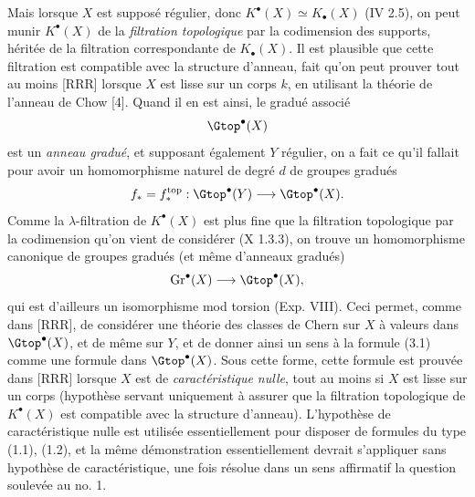 Mais lorsque $X$ est supposé régulier, donc $K^\bullet(X)\simeq K_\bullet(X)$ (IV 2.5), on peut munir $K^\bullet(X)$ de la \emph{filtration topologique} par la codimension des supports, héritée de la filtration correspondante de $K_\bullet(X)$. Il est plausible que cette filtration est compatible avec la structure d'anneau, fait qu'on peut prouver tout au moins [RRR] lorsque $X$ est lisse sur un corps $k$, en utilisant la théorie de l'anneau de Chow [4]. Quand il en est ainsi, le gradué associé
\[
 \Gtop^\bullet(X)
\]
est un \emph{anneau gradué}, et supposant également $Y$ régulier, on a fait ce qu'il fallait pour avoir un homomorphisme naturel de degré $d$ de groupes gradués
\[
 f_*=f_*^{\mathrm{top}}:\Gtop^\bullet(Y)\longrightarrow \Gtop^\bullet(X).
\]
Comme la $\lambda$-filtration de $K^\bullet(X)$ est plus fine que la filtration topologique par la codimension qu'on vient de considérer (X 1.3.3), on trouve un homomorphisme canonique de groupes gradués (et même d'anneaux gradués)
\[
 \operatorname{Gr}^\bullet(X)\longrightarrow \Gtop^\bullet(X),
\]
qui est d'ailleurs un isomorphisme mod torsion (Exp. VIII). Ceci permet, comme dans [RRR], de considérer une théorie des classes de Chern sur $X$ à valeurs dans $\Gtop^\bullet(X)$, et de même sur $Y$, et de donner ainsi un sens à la formule (3.1) comme une formule dans $\Gtop^\bullet(X)$. Sous cette forme, cette formule est prouvée dans [RRR] lorsque $X$ est de \emph{caractéristique nulle}, tout au moins si $X$ est lisse sur un corps (hypothèse servant uniquement à assurer que la filtration topologique de $K^\bullet(X)$ est compatible avec la structure d'anneau). L'hypothèse de caractéristique nulle est utilisée
essentiellement pour disposer de formules du type (1.1), (1.2), et la même démonstration essentiellement devrait s'appliquer sans hypothèse de caractéristique, une fois résolue dans un sens affirmatif la question soulevée au no. 1.

